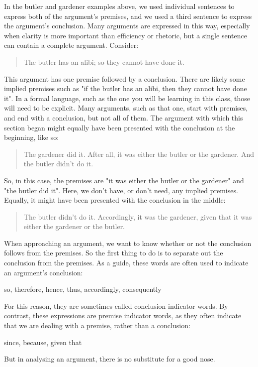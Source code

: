 In the butler and gardener examples above, we used individual sentences to express both of the argument’s premises, and we used a third sentence to express the argument’s conclusion. Many arguments are expressed in this way, especially when clarity is more important than efficiency or rhetoric, but a single sentence can contain a complete argument. Consider:
	\begin{quote}
		 The butler has an alibi; so they cannot have done it.
	\end{quote}
This argument has one premise followed by a conclusion. There are likely some \glspl{implied premise} such as "if the butler has an alibi, then they cannot have done it". In a formal language, such as the one you will be learning in this class, those will need to be explicit. Many arguments, such as that one,  start with premises, and end with a conclusion, but not all of them. The argument with which this section began might equally have been presented with the conclusion at the beginning, like so:
	\begin{quote}
		The gardener did it. After all, it was either the butler or the
		gardener. And the butler didn't do it.
	\end{quote}
So, in this case, the premises are "it was either the butler or the gardener" and "the butler did it". Here, we don't have, or don't need, any implied premises. Equally, it might have been presented with the conclusion in the middle:
	\begin{quote}
		The butler didn't do it. Accordingly, it was the gardener,
		given that it was either the gardener or the butler.
	\end{quote}
When approaching an argument, we want to know whether or not the conclusion follows from the premises. So the first thing to do is to separate out the conclusion from the premises. As a guide, these words are often used to indicate an argument's conclusion:
	\begin{center}
		so, therefore, hence, thus, accordingly, consequently
	\end{center}
For this reason, they are sometimes called \glspl{conclusion indicator word}. By contrast, these expressions are \glspl{premise indicator word}, as they often indicate that we are dealing with a premise, rather than a conclusion:
	\begin{center}
		since, because, given that
	\end{center}
But in analysing an argument, there is no substitute for a good nose.


